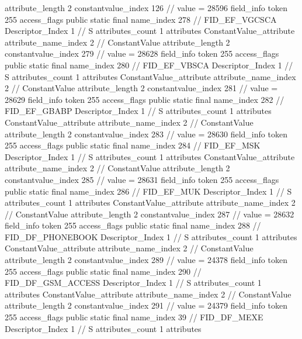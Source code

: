 {{{{{{{					attribute_length	2
					constantvalue_index	126		// value = 28596
				}
				}
			}
			field_info {
				token	255
				access_flags	public static final
				name_index	278		// FID_EF_VGCSCA
				Descriptor_Index	1		// S
				attributes_count	1
				attributes {
				ConstantValue_attribute {
					attribute_name_index	2		// ConstantValue
					attribute_length	2
					constantvalue_index	279		// value = 28628
				}
				}
			}
			field_info {
				token	255
				access_flags	public static final
				name_index	280		// FID_EF_VBSCA
				Descriptor_Index	1		// S
				attributes_count	1
				attributes {
				ConstantValue_attribute {
					attribute_name_index	2		// ConstantValue
					attribute_length	2
					constantvalue_index	281		// value = 28629
				}
				}
			}
			field_info {
				token	255
				access_flags	public static final
				name_index	282		// FID_EF_GBABP
				Descriptor_Index	1		// S
				attributes_count	1
				attributes {
				ConstantValue_attribute {
					attribute_name_index	2		// ConstantValue
					attribute_length	2
					constantvalue_index	283		// value = 28630
				}
				}
			}
			field_info {
				token	255
				access_flags	public static final
				name_index	284		// FID_EF_MSK
				Descriptor_Index	1		// S
				attributes_count	1
				attributes {
				ConstantValue_attribute {
					attribute_name_index	2		// ConstantValue
					attribute_length	2
					constantvalue_index	285		// value = 28631
				}
				}
			}
			field_info {
				token	255
				access_flags	public static final
				name_index	286		// FID_EF_MUK
				Descriptor_Index	1		// S
				attributes_count	1
				attributes {
				ConstantValue_attribute {
					attribute_name_index	2		// ConstantValue
					attribute_length	2
					constantvalue_index	287		// value = 28632
				}
				}
			}
			field_info {
				token	255
				access_flags	public static final
				name_index	288		// FID_DF_PHONEBOOK
				Descriptor_Index	1		// S
				attributes_count	1
				attributes {
				ConstantValue_attribute {
					attribute_name_index	2		// ConstantValue
					attribute_length	2
					constantvalue_index	289		// value = 24378
				}
				}
			}
			field_info {
				token	255
				access_flags	public static final
				name_index	290		// FID_DF_GSM_ACCESS
				Descriptor_Index	1		// S
				attributes_count	1
				attributes {
				ConstantValue_attribute {
					attribute_name_index	2		// ConstantValue
					attribute_length	2
					constantvalue_index	291		// value = 24379
				}
				}
			}
			field_info {
				token	255
				access_flags	public static final
				name_index	39		// FID_DF_MEXE
				Descriptor_Index	1		// S
				attributes_count	1
				attributes {
}}}}}}
